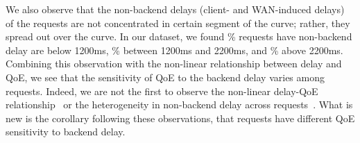 We also observe that the non-backend delays (client- and WAN-induced delays) of the requests are not concentrated in certain segment of the curve; rather, they spread out over the curve.
In our dataset, we found \fillme\% requests have non-backend delay are below 1200ms, \fillme\% between 1200ms and 2200ms, and \fillme\% above 2200ms. 
Combining this observation with the non-linear relationship between delay and QoE, we see that the sensitivity of QoE to the backend delay varies among requests. 
Indeed, we are not the first to observe the non-linear delay-QoE relationship~\cite{d3tcp, mun chiang's work} or the heterogeneity in non-backend delay across requests~\cite{timeciard,dqbarge}. 
What is new is the corollary following these observations, that requests have different QoE sensitivity to backend delay.

